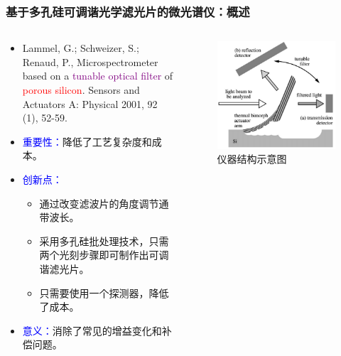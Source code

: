 \begin{frame}[c]
    \frametitle{基于多孔硅可调谐光学滤光片的微光谱仪：概述}
    \begin{columns}
        \begin{column}{.6\textwidth}
            \begin{itemize}
                \item Lammel, G.;  Schweizer, S.; Renaud, P., Microspectrometer based on a \textcolor{purple}{tunable optical filter} of \textcolor{red}{porous silicon}. Sensors and Actuators A: Physical 2001, 92 (1), 52-59.
                \item \textcolor{blue}{重要性：}降低了工艺复杂度和成本。
                \item \textcolor{blue}{创新点：}\begin{itemize}
                          \item 通过改变滤波片的角度调节通带波长。
                          \item 采用多孔硅批处理技术，只需两个光刻步骤即可制作出可调谐滤光片。
                          \item 只需要使用一个探测器，降低了成本。
                      \end{itemize}
                \item \textcolor{blue}{意义：}消除了常见的增益变化和补偿问题。
            \end{itemize}
        \end{column}
        \begin{column}{.4\textwidth}
            \begin{figure}[!htb] %
                \centering %
                \includegraphics[width=1.\textwidth]{figures/Microspectrometer based on a tunable optical filter of porous silicon_1.png} %
                \caption{仪器结构示意图} %
            \end{figure}
        \end{column}
    \end{columns}


\end{frame}
